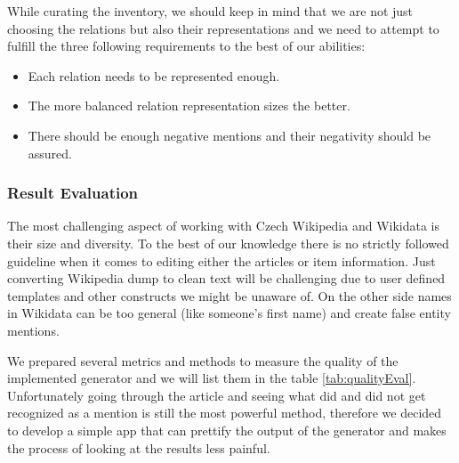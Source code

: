 While curating the inventory, we should keep in mind that we are not just choosing the relations but also their representations and we need to attempt to fulfill the three following requirements to the best of our abilities:
\begin{itemize}
\item Each relation needs to be represented enough.
\item The more balanced relation representation sizes the better.
\item There should be enough negative mentions and their negativity should be assured. 

\end{itemize}

\subsubsection{Result Evaluation}
The most challenging aspect of working with Czech Wikipedia and Wikidata is their size and diversity. To the best of our knowledge there is no strictly followed guideline when it comes to editing either the articles or item information. Just converting Wikipedia dump to clean text will be challenging due to user defined templates and other constructs we might be unaware of. On the other side names in Wikidata can be too general (like someone's first name) and create false entity mentions. 

We prepared several metrics and methods to measure the quality of the implemented generator and we will list them in the table \ref{tab:qualityEval}. Unfortunately going through the article and seeing what did and did not get recognized as a mention is still the most powerful method, therefore we decided to develop a simple app that can prettify the output of the generator and makes the process of looking at the results less painful.  


